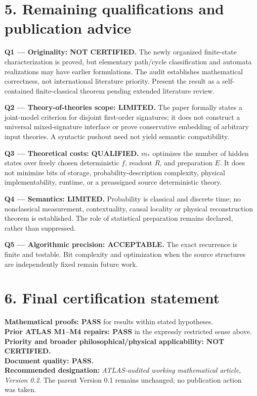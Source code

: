 \documentclass[11pt,letterpaper]{article}
\begin{document}
\section*{5. Remaining qualifications and publication advice}
\textbf{Q1 --- Originality: NOT CERTIFIED.} The newly organized finite-state characterization is proved, but elementary path/cycle classification and automata realizations may have earlier formulations. The audit establishes mathematical correctness, not international literature priority. Present the result as a self-contained finite-classical theorem pending extended literature review.

\textbf{Q2 --- Theory-of-theories scope: LIMITED.} The paper formally states a joint-model criterion for disjoint first-order signatures; it does not construct a universal mixed-signature interface or prove conservative embedding of arbitrary input theories. A syntactic pushout need not yield semantic compatibility.

\textbf{Q3 --- Theoretical costs: QUALIFIED.} $m_*$ optimizes the number of hidden states over freely chosen deterministic $f$, readout $R$, and preparation $E$. It does not minimize bits of storage, probability-description complexity, physical implementability, runtime, or a preassigned source deterministic theory.

\textbf{Q4 --- Semantics: LIMITED.} Probability is classical and discrete time; no nonclassical measurement, contextuality, causal locality or physical reconstruction theorem is established. The role of statistical preparation remains declared, rather than suppressed.

\textbf{Q5 --- Algorithmic precision: ACCEPTABLE.} The exact recurrence is finite and testable. Bit complexity and optimization when the source structures are independently fixed remain future work.

\section*{6. Final certification statement}
\textbf{Mathematical proofs: PASS} for results within stated hypotheses.\\
\textbf{Prior ATLAS M1--M4 repairs: PASS} in the expressly restricted sense above.\\
\textbf{Priority and broader philosophical/physical applicability: NOT CERTIFIED.}\\
\textbf{Document quality: PASS.}\\
\textbf{Recommended designation:} \emph{ATLAS-audited working mathematical article, Version 0.2}. The parent Version 0.1 remains unchanged; no publication action was taken.
\end{document}
